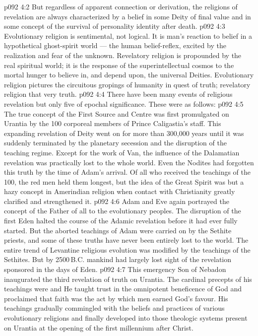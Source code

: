 \vs p092 4:2 But regardless of apparent connection or derivation, the religions of revelation are always characterized by a belief in some Deity of final value and in some concept of the survival of personality identity after death.
\vs p092 4:3 Evolutionary religion is sentimental, not logical. It is man’s reaction to belief in a hypothetical ghost\hyp{}spirit world --- the human belief\hyp{}reflex, excited by the realization and fear of the unknown. Revelatory religion is propounded by the real spiritual world; it is the response of the superintellectual cosmos to the mortal hunger to believe in, and depend upon, the universal Deities. Evolutionary religion pictures the circuitous gropings of humanity in quest of truth; revelatory religion  that very truth.
\vs p092 4:4 \pc There have been many events of religious revelation but only five of epochal significance. These were as follows:
\vs p092 4:5 \bibnobreakspace {} The true concept of the First Source and Centre was first promulgated on Urantia by the 100 corporeal members of Prince Caligastia’s staff. This expanding revelation of Deity went on for more than 300,000 years until it was suddenly terminated by the planetary secession and the disruption of the teaching regime. Except for the work of Van, the influence of the Dalamatian revelation was practically lost to the whole world. Even the Nodites had forgotten this truth by the time of Adam’s arrival. Of all who received the teachings of the 100, the red men held them longest, but the idea of the Great Spirit was but a hazy concept in Amerindian religion when contact with Christianity greatly clarified and strengthened it.
\vs p092 4:6 \bibnobreakspace {} Adam and Eve again portrayed the concept of the Father of all to the evolutionary peoples. The disruption of the first Eden halted the course of the Adamic revelation before it had ever fully started. But the aborted teachings of Adam were carried on by the Sethite priests, and some of these truths have never been entirely lost to the world. The entire trend of Levantine religious evolution was modified by the teachings of the Sethites. But by 2500\,B.C. mankind had largely lost sight of the revelation sponsored in the days of Eden.
\vs p092 4:7 \bibnobreakspace {} This emergency Son of Nebadon inaugurated the third revelation of truth on Urantia. The cardinal precepts of his teachings were  and  He taught trust in the omnipotent beneficence of God and proclaimed that faith was the act by which men earned God’s favour. His teachings gradually commingled with the beliefs and practices of various evolutionary religions and finally developed into those theologic systems present on Urantia at the opening of the first millennium after Christ.
